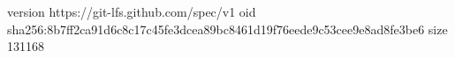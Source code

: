 version https://git-lfs.github.com/spec/v1
oid sha256:8b7ff2ca91d6c8c17c45fe3dcea89bc8461d19f76eede9c53cee9e8ad8fe3be6
size 131168
